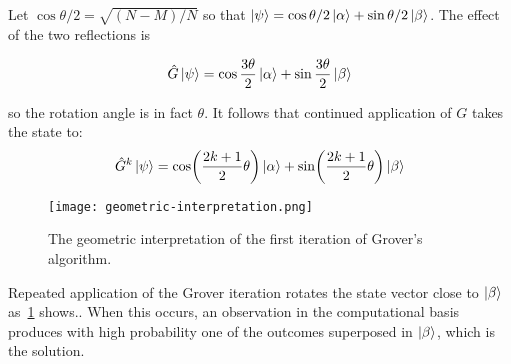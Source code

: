  Let $\cos\theta/2 = \sqrt{(N-M)/N}$ so that $\ket{\psi} = \cos\theta/2\ket{\alpha} + \sin\theta/2\ket{\beta}$.  The effect of the two reflections is
 
 \begin{equation*}
    \hat{G}\ket{\psi} = \cos\frac{3\theta}{2} \ket{\alpha} + \sin\frac{3\theta}{2} \ket{\beta}
\end{equation*}

so the rotation angle is in fact $\theta$. It follows that continued application of $G$ takes the state to:
\begin{equation*}
    \hat{G}^{k}\ket{\psi} = \cos\biggl(\frac{2k+1}{2}\theta\biggr) \ket{\alpha} + \sin\biggl(\frac{2k+1}{2}\theta\biggr) \ket{\beta}
\end{equation*}

\begin{figure}
\texttt{[image: geometric-interpretation.png]}
\centering
\caption{The geometric interpretation of the first iteration of Grover's algorithm.}
\label{fig:geometric-interpretation}
\end{figure}

Repeated application of the Grover iteration rotates the state vector close to $\ket{\beta}$ as~\ref{fig:geometric-interpretation} shows.. When this occurs, an observation in the computational basis produces with high probability one of the outcomes superposed in $\ket{\beta}$, which is the solution.

